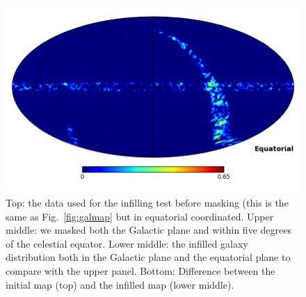 \documentclass[useAMS,usenatbib]{mn2e}
\begin{document}
\begin{figure}
  \includegraphics[width=\columnwidth]{infill_test_diffC.png}
  \caption{Top: the data used for the infilling test before masking
    (this is the same as Fig.~\ref{fig:galmap} but in equatorial
    coordinated.  Upper middle: we masked both the Galactic plane and within
    five degrees of the celestial equator.  Lower middle: the infilled galaxy
    distribution both in the Galactic plane and the equatorial plane
    to compare with the upper panel. Bottom: Difference between the initial map (top) and the
    infilled map (lower middle).}
  \label{fig:infilling_test}
\end{figure}
\end{document}
